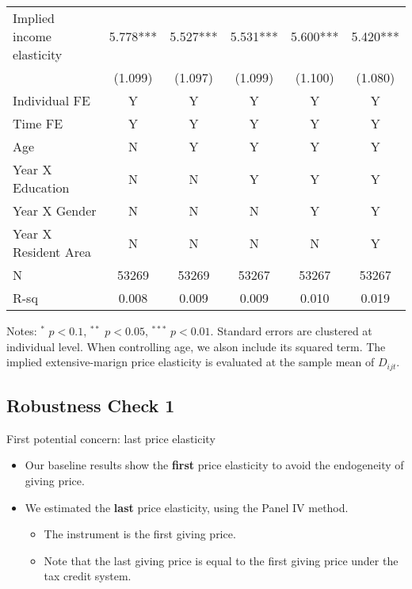 \documentclass[ review  , 3p ]{elsarticle}
\providecommand{\tightlist}{%
  \setlength{\itemsep}{0pt}\setlength{\parskip}{0pt}}
\begin{document}
\begin{table}
\begin{threeparttable}
\begin{tabular}[t]{lccccc}
  \hspace{1em}Implied income elasticity & 5.778*** & 5.527*** & 5.531*** & 5.600*** & 5.420***\\
  \hspace{1em} & (1.099) & (1.097) & (1.099) & (1.100) & (1.080)\\
  \hspace{1em}Individual FE & Y & Y & Y & Y & Y\\
  \hspace{1em}Time FE & Y & Y & Y & Y & Y\\
  \hspace{1em}Age & N & Y & Y & Y & Y\\
  \hspace{1em}Year X Education & N & N & Y & Y & Y\\
  \hspace{1em}Year X Gender & N & N & N & Y & Y\\
  \hspace{1em}Year X Resident Area & N & N & N & N & Y\\
  \hspace{1em}N & 53269 & 53269 & 53267 & 53267 & 53267\\
  \hspace{1em}R-sq & 0.008 & 0.009 & 0.009 & 0.010 & 0.019\\
  \bottomrule
  \end{tabular}
  \begin{tablenotes}
  \item Notes: $^{*}$ $p < 0.1$, $^{**}$ $p < 0.05$, $^{***}$ $p < 0.01$. Standard errors are clustered at individual level. When controlling age, we alson include its squared term. The implied extensive-marign price elasticity is evaluated at the sample mean of $D_{ijt}$.
  \end{tablenotes}
  \end{threeparttable}
  \end{table}

  \hypertarget{robustness-check-1}{%
  \subsection{Robustness Check 1}\label{robustness-check-1}}

  First potential concern: last price elasticity

  \begin{itemize}
  \tightlist
  \item
    Our baseline results show the \textbf{first} price elasticity to avoid the endogeneity of giving price.
  \item
    We estimated the \textbf{last} price elasticity, using the Panel IV method.

    \begin{itemize}
    \tightlist
    \item
      The instrument is the first giving price.
    \item
      Note that the last giving price is equal to the first giving price under the tax credit system.
    \end{itemize}
  \end{itemize}
\end{document}
